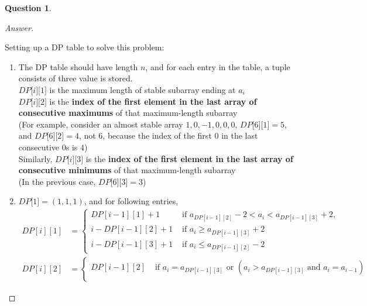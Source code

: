 \documentclass{article}
\theoremstyle{plain}
\newtheorem{question}{Question}
\newenvironment{answer}[1][Answer]
    {\begin{proof}[#1]{$ $}\renewcommand\qedsymbol{$\vartriangle$}}
    {\end{proof}}
\begin{document}
\begin{question}
\end{question}
\begin{answer}
    \begin{enumerate}
        Setting up a DP table to solve this problem:
        \begin{enumerate}
            \item
            The DP table should have length $n$, and for each entry in the table, a tuple consists of three value is stored.\\
            $DP\lbrack i \rbrack \lbrack 1 \rbrack $ is the maximum length of stable subarray ending at $a_i$\\
            $DP\lbrack i \rbrack \lbrack 2 \rbrack $ is the \textbf{index of the first element in the last array of consecutive maximums} of that maximum-length subarray \\
            (For example, consider an almost stable array $1, 0, -1, 0, 0, 0$, $DP\lbrack 6 \rbrack \lbrack 1 \rbrack = 5$, and $DP\lbrack 6 \rbrack \lbrack 2 \rbrack = 4$, not $6$, because the index of the first $0$ in the last consecutive $0$s is $4$)\\
            Similarly, $DP\lbrack i \rbrack \lbrack 3 \rbrack $ is the \textbf{index of the first element in the last array of consecutive minimums} of that maximum-length subarray \\
            (In the previous case, $DP\lbrack 6 \rbrack \lbrack 3 \rbrack = 3$)
            \item
            $DP \lbrack 1 \rbrack = (1, 1, 1) $, and for following entries,
            \begin{equation*}
                \begin{aligned}
                    DP[i][1] &=
                    \begin{cases}
                        DP[i-1][1] + 1 &\text{ if } a_{DP[i-1][2]} - 2 < a_i < a_{DP[i-1][3]} + 2, \\
                        i - DP[i-1][2] + 1 &\text{ if } a_i \geq  a_{DP [i-1][3]} + 2\\
                        i - DP[i-1][3] + 1 &\text{ if } a_i \leq a_{DP[i-1][2]} - 2
                    \end{cases} \\
                    DP[i][2] &=
                    \begin{cases}
                        DP[i-1][2] &\text{ if } a_i = a_{DP[i-1][3]} \text{ or } (a_i > a_{DP[i-1][3]} \text{ and } a_i = a_{i-1})\\

\end{cases}
\end{aligned}
\end{equation*}
\end{enumerate}
\end{enumerate}
\end{answer}
\end{document}
